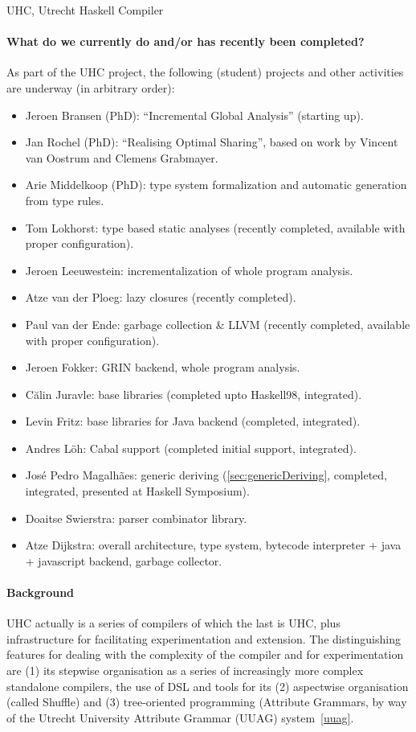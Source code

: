 \begin{hcarentry}{UHC, Utrecht Haskell Compiler}
\paragraph{What do we currently do and/or has recently been completed?}
As part of the UHC project, the following (student) projects and other activities are underway (in arbitrary order):
\begin{itemize}
\item Jeroen Bransen (PhD): ``Incremental Global Analysis'' (starting up).
\item Jan Rochel (PhD): ``Realising Optimal Sharing'', based on work by Vincent van Oostrum and Clemens Grabmayer.
\item Arie Middelkoop (PhD): type system formalization and automatic generation from type rules.
\item Tom Lokhorst: type based static analyses (recently completed, available with proper configuration).
\item Jeroen Leeuwestein: incrementalization of whole program analysis.
\item Atze van der Ploeg: lazy closures (recently completed).
\item Paul van der Ende: garbage collection \& LLVM (recently completed, available with proper configuration).
\item Jeroen Fokker: GRIN backend, whole program analysis.
\item C\u alin Juravle: base libraries (completed upto Haskell98, integrated).
\item Levin Fritz: base libraries for Java backend (completed, integrated).
\item Andres L\"oh: Cabal support (completed initial support, integrated).
\item Jos\'e Pedro Magalh\~{a}es: generic deriving (\cref{sec:genericDeriving}, completed, integrated, presented at Haskell Symposium).
\item Doaitse Swierstra: parser combinator library.
\item Atze Dijkstra: overall architecture, type system, bytecode interpreter + java + javascript backend, garbage collector.
\end{itemize}

\paragraph{Background}

UHC actually is a series of compilers of which the last is UHC, plus
infrastructure for facilitating experimentation and extension.
The distinguishing features for dealing with the complexity of the compiler and for experimentation are
(1) its stepwise organisation as a series of increasingly more complex standalone compilers,
the use of DSL and tools for its (2) aspectwise organisation (called Shuffle) and
(3) tree-oriented programming (Attribute Grammars, by way of the
Utrecht University Attribute Grammar (UUAG) system~\cref{uuag}.


\end{hcarentry}
